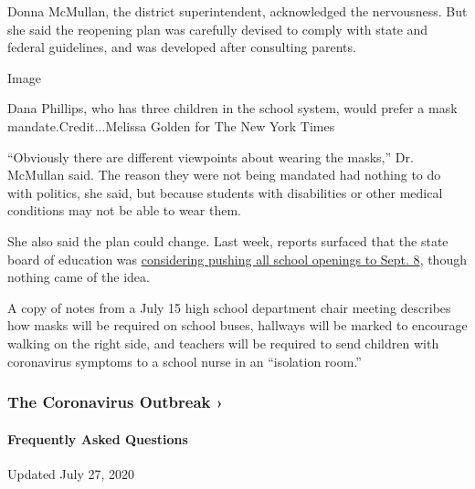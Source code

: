 Donna McMullan, the district superintendent, acknowledged the
nervousness. But she said the reopening plan was carefully devised to
comply with state and federal guidelines, and was developed after
consulting parents.

Image

Dana Phillips, who has three children in the school system, would prefer
a mask mandate.Credit...Melissa Golden for The New York Times

``Obviously there are different viewpoints about wearing the masks,''
Dr. McMullan said. The reason they were not being mandated had nothing
to do with politics, she said, but because students with disabilities or
other medical conditions may not be able to wear them.

She also said the plan could change. Last week, reports surfaced that
the state board of education was
\href{https://www.ajc.com/education/get-schooled-blog/state-may-impose-statewide-start-date-of-sept-8/O5WRRZX3EFCL5KKFPVQ3KYRURU/\#:~:text=Activate\%20My\%20Account-,Georgia\%20may\%20push\%20statewide\%20start\%20date\%20of\%20Sept.\%208\%20for,start\%20of\%20school\%20until\%20September.\&text=At\%20its\%20meeting\%20Thursday\%2C\%20the,school\%20statewide\%20until\%20Sept.\%208.}{considering
pushing all school openings to Sept. 8}, though nothing came of the
idea.

A copy of notes from a July 15 high school department chair meeting
describes how masks will be required on school buses, hallways will be
marked to encourage walking on the right side, and teachers will be
required to send children with coronavirus symptoms to a school nurse in
an ``isolation room.''

\href{https://www.nytimes.com/news-event/coronavirus?action=click\&pgtype=Article\&state=default\&region=MAIN_CONTENT_3\&context=storylines_faq}{}

\hypertarget{the-coronavirus-outbreak-}{%
\subsubsection{The Coronavirus Outbreak
›}\label{the-coronavirus-outbreak-}}

\hypertarget{frequently-asked-questions}{%
\paragraph{Frequently Asked
Questions}\label{frequently-asked-questions}}

Updated July 27, 2020

